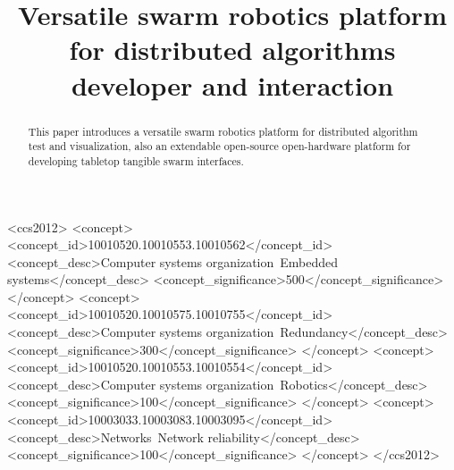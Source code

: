 \documentclass[sigconf]{acmart}
\begin{document}
\title{Versatile swarm robotics platform for distributed algorithms developer and interaction}




\renewcommand{\shortauthors}{Tingliang and Haipeng}

\begin{abstract}
  This paper introduces a versatile swarm robotics platform for distributed algorithm test and visualization, also an extendable open-source open-hardware platform for developing tabletop tangible swarm interfaces.

\end{abstract}

\begin{CCSXML}
<ccs2012>
 <concept>
  <concept_id>10010520.10010553.10010562</concept_id>
  <concept_desc>Computer systems organization~Embedded systems</concept_desc>
  <concept_significance>500</concept_significance>
 </concept>
 <concept>
  <concept_id>10010520.10010575.10010755</concept_id>
  <concept_desc>Computer systems organization~Redundancy</concept_desc>
  <concept_significance>300</concept_significance>
 </concept>
 <concept>
  <concept_id>10010520.10010553.10010554</concept_id>
  <concept_desc>Computer systems organization~Robotics</concept_desc>
  <concept_significance>100</concept_significance>
 </concept>
 <concept>
  <concept_id>10003033.10003083.10003095</concept_id>
  <concept_desc>Networks~Network reliability</concept_desc>
  <concept_significance>100</concept_significance>
 </concept>
</ccs2012>
\end{CCSXML}
\end{document}
